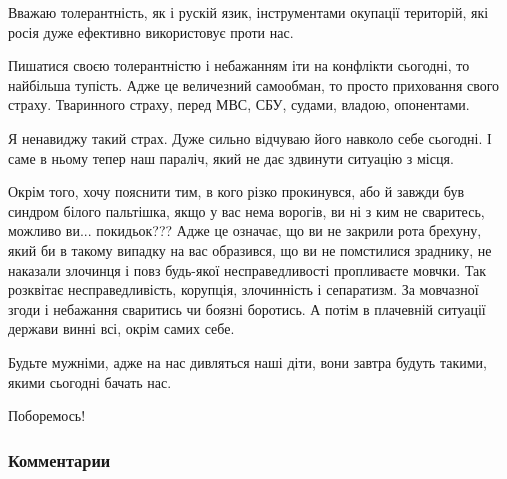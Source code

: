 Вважаю толерантність, як і рускій язик, інструментами окупації територій, які
росія дуже ефективно використовує проти нас. 

Пишатися своєю толерантністю і небажанням іти на конфлікти сьогодні, то
найбільша тупість. Адже це величезний самообман, то просто приховання свого
страху. Тваринного страху, перед МВС, СБУ, судами, владою, опонентами. 

Я ненавиджу такий страх. Дуже сильно відчуваю його навколо себе сьогодні. І
саме в ньому тепер наш параліч, який не дає здвинути ситуацію з місця. 

Окрім того, хочу пояснити тим, в кого різко прокинувся, або й завжди був
синдром білого пальтішка, якщо у вас нема ворогів, ви ні з ким не сваритесь,
можливо ви... покидьок??? Адже це означає, що ви не закрили рота брехуну, який
би в такому випадку на вас образився, що ви не помстилися зраднику, не наказали
злочинця і повз будь-якої несправедливості пропливаєте мовчки. Так розквітає
несправедливість, корупція, злочинність і сепаратизм. За мовчазної згоди і
небажання сваритись чи боязні боротись. А потім в плачевній ситуації держави
винні всі, окрім самих себе.

Будьте мужніми, адже на нас дивляться наші діти, вони завтра будуть такими,
якими сьогодні бачать нас. 

Поборемось!

\subsubsection{Комментарии}

